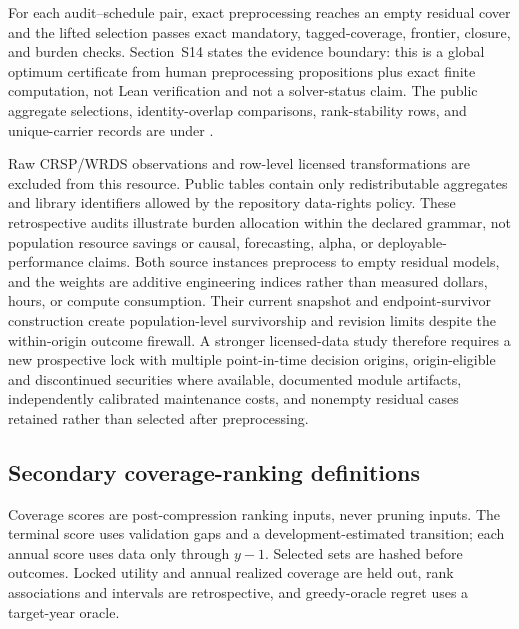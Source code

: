 

For each audit--schedule pair, exact preprocessing reaches an empty residual
cover and the lifted selection passes exact mandatory, tagged-coverage,
frontier, closure, and burden checks. Section~S14 states the evidence boundary:
this is a global optimum certificate from human preprocessing propositions plus
exact finite computation, not Lean verification and not a solver-status claim.
The public aggregate selections, identity-overlap comparisons, rank-stability
rows, and unique-carrier records are under
.

Raw CRSP/WRDS observations and row-level licensed transformations are excluded
from this resource. Public tables contain only redistributable aggregates and
library identifiers allowed by the repository data-rights policy. These
retrospective audits illustrate burden allocation within the declared grammar,
not population resource savings or causal, forecasting, alpha, or deployable-
performance claims. Both source instances preprocess to empty residual models,
and the weights are additive engineering indices rather than measured dollars,
hours, or compute consumption. Their current snapshot and endpoint-survivor
construction create population-level survivorship and revision limits despite
the within-origin outcome firewall. A stronger licensed-data study therefore
requires a new prospective lock with multiple point-in-time decision origins,
origin-eligible and discontinued securities where available, documented module
artifacts, independently calibrated maintenance costs, and nonempty residual
cases retained rather than selected after preprocessing.

\subsection{Secondary coverage-ranking definitions}
\label{sec:supp-financial-coverage}

Coverage scores are post-compression ranking inputs, never pruning inputs.
The terminal score uses validation gaps and a development-estimated
transition; each annual score uses data only through \(y-1\).  Selected sets
are hashed before outcomes.  Locked utility and annual realized coverage are
held out, rank associations and intervals are retrospective, and
greedy-oracle regret uses a target-year oracle.

